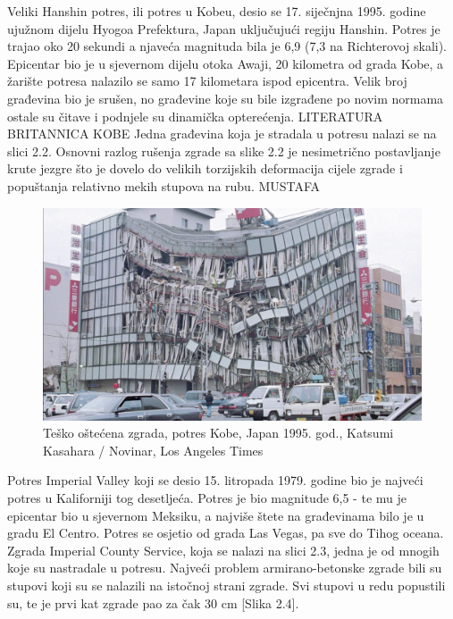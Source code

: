 \documentclass[12pt]{book}
\begin{document}
\newpage

Veliki Hanshin potres, ili potres u Kobeu, desio se 17. siječnjna 1995. godine ujužnom dijelu Hyogoa Prefektura, Japan uključujući regiju Hanshin. Potres je trajao oko 20 sekundi a njaveća magnituda bila je 6,9 (7,3 na Richterovoj skali). Epicentar bio je u sjevernom dijelu otoka Awaji, 20 kilometra od grada Kobe, a žarište potresa nalazilo se samo 17 kilometara ispod epicentra. Velik broj građevina bio je srušen, no građevine koje su bile izgrađene po novim normama ostale su čitave i podnjele su dinamička opterećenja. LITERATURA BRITANNICA KOBE Jedna građevina koja je stradala u potresu nalazi se na slici 2.2. Osnovni razlog rušenja zgrade sa slike 2.2 je nesimetrično postavljanje krute jezgre što je dovelo do velikih torzijskih deformacija cijele zgrade i popuštanja relativno mekih stupova na rubu. MUSTAFA

\begin{figure}[h]
	\centering
	\includegraphics[width=1\linewidth]{Slike/screenshot004}
	\caption{Teško oštećena zgrada, potres Kobe, Japan 1995. god., Katsumi Kasahara / Novinar, Los Angeles Times }
	\label{fig:screenshot004_novo}
\end{figure}

\newpage

Potres Imperial Valley koji se desio 15. litropada 1979. godine bio je najveći potres u Kaliforniji tog desetljeća. Potres je bio magnitude 6,5 - te mu je epicentar bio u sjevernom Meksiku, a najviše štete na građevinama bilo je u gradu El Centro. Potres se osjetio od grada Las Vegas, pa sve do Tihog oceana. Zgrada Imperial County Service, koja se nalazi na slici 2.3,  jedna je od mnogih koje su nastradale u potresu. Najveći problem armirano-betonske zgrade bili su stupovi koji su se nalazili na istočnoj strani zgrade. Svi stupovi u redu popustili su, te je prvi kat zgrade pao za čak 30 cm [Slika 2.4]. 
\end{document}
